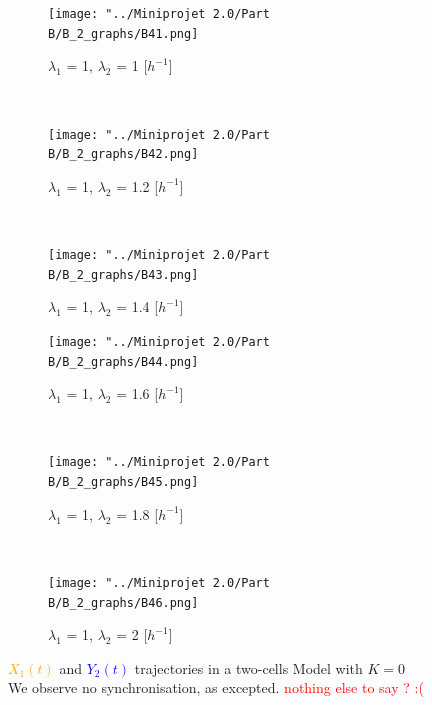 \documentclass[10pt,a4paper,oneside,twocolumn]{article}
\newcommand{\red}[1]{\textcolor{red}{#1}}
\newcommand{\blue}[1]{\textcolor{blue}{#1}}
\newcommand{\orange}[1]{\textcolor{orange}{#1}}
\numberwithin{equation}{section} %
\begin{document}
   \begin{figure}
    \centering
	\begin{subfigure}[b]{0.32\textwidth}
	    \texttt{[image: "../Miniprojet 2.0/Part B/B\_2\_graphs/B41.png]}
	    \caption{$\lambda_1$ = 1, $\lambda_2$ = 1 [$h^{-1}$]}
	\end{subfigure}
	~ 
	\begin{subfigure}[b]{0.32\textwidth}
	    \texttt{[image: "../Miniprojet 2.0/Part B/B\_2\_graphs/B42.png]}
	    \caption{$\lambda_1$ = 1, $\lambda_2$ = 1.2 [$h^{-1}$]}
	\end{subfigure}
	~ 
	\begin{subfigure}[b]{0.32\textwidth}
	    \texttt{[image: "../Miniprojet 2.0/Part B/B\_2\_graphs/B43.png]}
	    \caption{$\lambda_1$ = 1, $\lambda_2$ = 1.4 [$h^{-1}$]}
	\end{subfigure}
	 
	\begin{subfigure}[b]{0.32\textwidth}
	    \texttt{[image: "../Miniprojet 2.0/Part B/B\_2\_graphs/B44.png]}
	    \caption{$\lambda_1$ = 1, $\lambda_2$ = 1.6 [$h^{-1}$]}
	\end{subfigure}
	~ 
	\begin{subfigure}[b]{0.32\textwidth}
	    \texttt{[image: "../Miniprojet 2.0/Part B/B\_2\_graphs/B45.png]}
	    \caption{$\lambda_1$ = 1, $\lambda_2$ = 1.8 [$h^{-1}$]}
	\end{subfigure}
	~ 
	\begin{subfigure}[b]{0.32\textwidth}
	    \texttt{[image: "../Miniprojet 2.0/Part B/B\_2\_graphs/B46.png]}
	    \caption{$\lambda_1$ = 1, $\lambda_2$ = 2 [$h^{-1}$]}
	\end{subfigure}

	\caption{\orange{$X_1(t)$} and \blue{$Y_2(t)$} trajectories in a two-cells Model with $K=0$ \\
	We observe no synchronisation, as excepted. \red{nothing else to say ? :(}}
    \end{figure}
\end{document}
